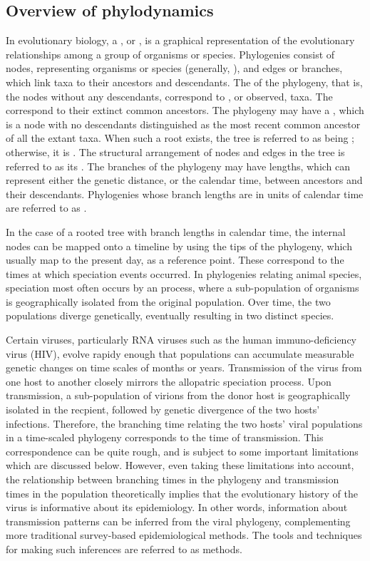 \subsection{Overview of phylodynamics}

In evolutionary biology, a , or , is a
graphical representation of the evolutionary relationships among a group of
organisms or species. Phylogenies consist of nodes, representing organisms or
species (generally, ), and edges or branches, which link taxa to
their ancestors and descendants. The  of the phylogeny, that is, the
nodes without any descendants, correspond to , or observed, taxa.
The  correspond to their extinct common ancestors. The
phylogeny may have a , which is a node with no descendants
distinguished as the most recent common ancestor of all the extant taxa. When
such a root exists, the tree is referred to as being ; otherwise,
it is . The structural arrangement of nodes and edges in the
tree is referred to as its . The branches of the phylogeny may
have lengths, which can represent either the genetic distance, or the calendar
time, between ancestors and their descendants. Phylogenies whose branch lengths
are in units of calendar time are referred to as .

In the case of a rooted tree with branch lengths in calendar time, the internal
nodes can be mapped onto a timeline by using the tips of the phylogeny, which
usually map to the present day, as a reference point. These  correspond to the times at which speciation events occurred. In
phylogenies relating animal species, speciation most often occurs by an
 process, where a sub-population of organisms is
geographically isolated from the original population. Over time, the two
populations diverge genetically, eventually resulting in two distinct species.

Certain viruses, particularly RNA viruses such as the human immuno-deficiency
virus (HIV), evolve rapidy enough that populations can accumulate measurable
genetic changes on time scales of months or years. Transmission of the virus
from one host to another closely mirrors the allopatric speciation process.
Upon transmission, a sub-population of virions from the donor host is
geographically isolated in the recpient, followed by genetic divergence of the
two hosts' infections. Therefore, the branching time relating the two hosts'
viral populations in a time-scaled phylogeny corresponds to the time of
transmission. This correspondence can be quite rough, and is subject to some
important limitations which are discussed below. However, even taking these
limitations into account, the relationship between branching times in the
phylogeny and transmission times in the population theoretically implies that
the evolutionary history of the virus is informative about its epidemiology. In
other words, information about transmission patterns can be inferred from the
viral phylogeny, complementing more traditional survey-based epidemiological
methods. The tools and techniques for making such inferences are referred to as
 methods.

